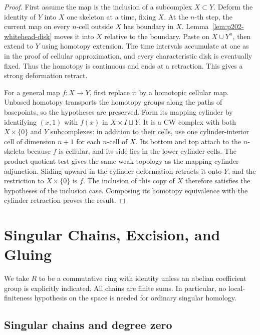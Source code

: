 \documentclass[11pt,oneside,openany]{book}
\theoremstyle{plain}
\theoremstyle{definition}
\theoremstyle{remark}
\begin{document}
\begin{proof}
First assume the map is the inclusion of a
subcomplex \(X\subset Y\). Deform the identity
of \(Y\) into \(X\) one skeleton at a time,
fixing \(X\). At the \(n\)-th step, the
current map on every \(n\)-cell outside \(X\)
has boundary in \(X\). Lemma~\ref{lem:p202-whitehead-disk}
moves it into \(X\) relative to the boundary.
Paste on \(X\cup Y^n\), then extend to \(Y\)
using homotopy extension. The time intervals
accumulate at one as in the proof of cellular
approximation, and every characteristic disk is
eventually fixed. Thus the homotopy is continuous
and ends at a retraction. This gives a strong
deformation retract.

For a general map \(f:X\to Y\), first replace it
by a homotopic cellular map. Unbased homotopy
transports the homotopy groups along the paths of
basepoints, so the hypotheses are preserved.
Form its mapping cylinder by identifying
\((x,1)\) with \(f(x)\) in \(X\times I\sqcup Y\).
It is a CW complex with both \(X\times\{0\}\)
and \(Y\) subcomplexes: in addition to their
cells, use one cylinder-interior cell of
dimension \(n+1\) for each \(n\)-cell of \(X\).
Its bottom and top attach to the \(n\)-skeleta
because \(f\) is cellular, and its side lies in
the lower cylinder cells. The product quotient
test gives the same weak topology as the
mapping-cylinder adjunction. Sliding upward in
the cylinder deformation retracts it onto \(Y\),
and the restriction to \(X\times\{0\}\) is \(f\).
The inclusion of this copy of \(X\) therefore
satisfies the hypotheses of the inclusion case.
Composing its homotopy equivalence with the
cylinder retraction proves the result.
\end{proof}


\chapter{Singular Chains, Excision, and Gluing}

We take \(R\) to be a commutative ring with identity unless
an abelian coefficient group is explicitly indicated. All
chains are finite sums. In particular, no local-finiteness
hypothesis on the space is needed for ordinary singular
homology.

\section{Singular chains and degree zero}\label{p202:T14}
\end{document}
